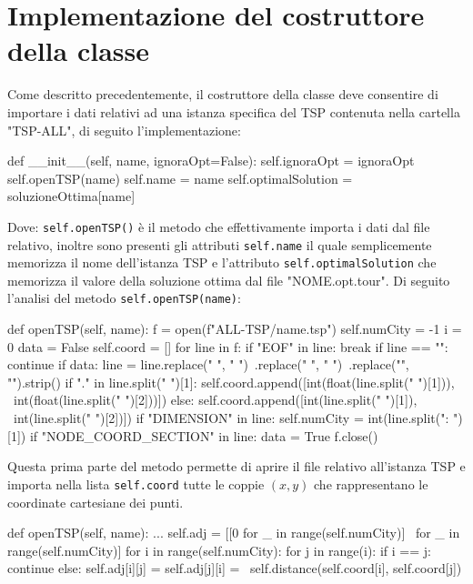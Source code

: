 \documentclass[a4paper,12pt]{report}
\begin{document}
\section{Implementazione del costruttore della classe}
Come descritto precedentemente, il costruttore della classe deve consentire di importare i dati relativi ad una istanza specifica del TSP contenuta nella cartella "TSP-ALL", di seguito l'implementazione:
\begin{python}
def __init__(self, name, ignoraOpt=False):
  self.ignoraOpt = ignoraOpt
  self.openTSP(name)
  self.name = name
  self.optimalSolution = soluzioneOttima[name]
\end{python}
Dove: \lstinline!self.openTSP()! è il metodo che effettivamente importa i dati dal file relativo, inoltre sono presenti gli attributi \lstinline!self.name! il quale semplicemente memorizza il nome dell'istanza TSP e l'attributo \lstinline!self.optimalSolution! che memorizza il valore della soluzione ottima dal file "NOME.opt.tour". \hfill \break
Di seguito l'analisi del metodo \lstinline!self.openTSP(name)!:
\begin{python}
def openTSP(self, name):
  f = open(f"ALL-TSP/{name}.tsp")
  self.numCity = -1
  i = 0
  data = False
  self.coord = []
  for line in f:
    if "EOF" in line:
      break
    if line == "":
      continue
    if data:
      line = line.replace("  ", " ")\
              .replace("  ", " ")\
              .replace("\n", "").strip()
      if "." in line.split(" ")[1]:
          self.coord.append([int(float(line.split(" ")[1])), \
                             int(float(line.split(" ")[2]))])
      else:
          self.coord.append([int(line.split(" ")[1]), \
                             int(line.split(" ")[2])])
    if "DIMENSION" in line:
      self.numCity = int(line.split(": ")[1])
    if "NODE_COORD_SECTION" in line:
      data = True
  f.close()
\end{python}
Questa prima parte del metodo permette di aprire il file relativo all'istanza TSP e importa nella lista \lstinline!self.coord! tutte le coppie $(x, y)$ che rappresentano le coordinate cartesiane dei punti.
\begin{python}
def openTSP(self, name):
  ...
  self.adj = [[0 for _ in range(self.numCity)] \
               for _ in range(self.numCity)]
  for i in range(self.numCity):
    for j in range(i):
      if i == j:
        continue
      else:
        self.adj[i][j] = self.adj[j][i] = \
           self.distance(self.coord[i], self.coord[j])
\end{python}
\end{document}
